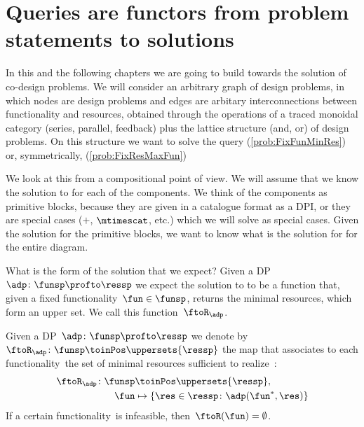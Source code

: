 \section{Queries are functors from problem statements to solutions}

\publictodomessage

In this and the following chapters we are going to build towards the solution of co-design problems.
We will consider an arbitrary graph of design problems, in which nodes are design problems and edges are arbitary interconnections between functionality and resources, obtained through the operations of a traced monoidal category (series, parallel, feedback) plus the lattice structure (and, or) of design problems.
On this structure we want to solve the query \FixFunMinRes (\cref{prob:FixFunMinRes}) or, symmetrically, \FixResMaxFun (\cref{prob:FixResMaxFun})


We look at this from a compositional point of view.
We will assume that we know the solution to \FixFunMinRes for each of the components.
We think of the components as primitive blocks, because they are given in a catalogue format as a DPI, or they are special cases ($+$, $\mtimescat$, etc.) which we will solve as special cases.
Given the solution for the primitive blocks, we want to know what is the solution for \FixFunMinRes for the entire diagram.

What is the form of the solution that we expect?
Given a DP~$\adp\colon \funsp \profto \ressp$ we expect the solution to \FixFunMinRes to be a function that, given a fixed functionality~$\fun\in\funsp$, returns the minimal resources, which form an upper set.
We call this function~$\ftoR_\adp$.

\begin{definition}
    \label{def:ftoR-dp}
    Given a DP~$\adp\colon\funsp\profto\ressp$ we denote by~$\ftoR_{\adp}\colon \funsp\toinPos \uppersets{\ressp}$ the map that associates to each functionality~\fun the set of minimal resources sufficient to realize~\fun:
    \begin{equation*}
        \begin{aligned}
            \ftoR_{\adp}\colon \funsp &\toinPos \uppersets{\ressp},\\
            \fun &\mapsto \{ \res \in \ressp \colon \adp(\fun^*, \res)\}
        \end{aligned}
    \end{equation*}
    If a certain functionality~\fun is infeasible, then~$\ftoR(\fun)=\emptyset$.
\end{definition}

